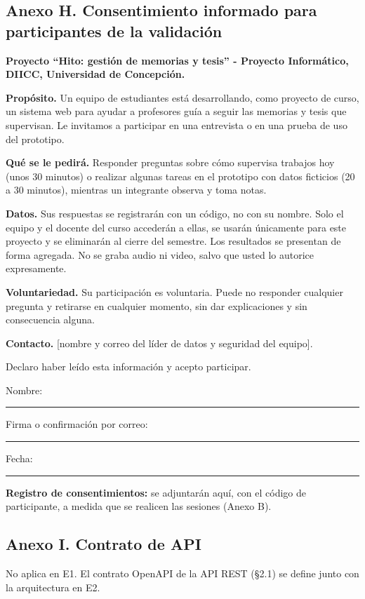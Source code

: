 \documentclass[10pt,a4paper]{article}
\newcommand{\ph}[1]{{\color{nota}#1}}
\begin{document}
\subsection*{Anexo H. Consentimiento informado para participantes de la validación}
\begin{cajainfo}
\textbf{Proyecto ``Hito: gestión de memorias y tesis'' - Proyecto Informático, DIICC, Universidad de Concepción.}\par
\textbf{Propósito.} Un equipo de estudiantes está desarrollando, como proyecto de curso, un sistema web para ayudar a profesores guía a seguir las memorias y tesis que supervisan. Le invitamos a participar en una entrevista o en una prueba de uso del prototipo.\par
\textbf{Qué se le pedirá.} Responder preguntas sobre cómo supervisa trabajos hoy (unos 30 minutos) o realizar algunas tareas en el prototipo con datos ficticios (20 a 30 minutos), mientras un integrante observa y toma notas.\par
\textbf{Datos.} Sus respuestas se registrarán con un código, no con su nombre. Solo el equipo y el docente del curso accederán a ellas, se usarán únicamente para este proyecto y se eliminarán al cierre del semestre. Los resultados se presentan de forma agregada. No se graba audio ni video, salvo que usted lo autorice expresamente.\par
\textbf{Voluntariedad.} Su participación es voluntaria. Puede no responder cualquier pregunta y retirarse en cualquier momento, sin dar explicaciones y sin consecuencia alguna.\par
\textbf{Contacto.} \ph{[nombre y correo del líder de datos y seguridad del equipo]}.\par
\medskip
Declaro haber leído esta información y acepto participar.\par
Nombre: \rule{5cm}{0.4pt}\quad Firma o confirmación por correo: \rule{4cm}{0.4pt}\quad Fecha: \rule{2.5cm}{0.4pt}
\end{cajainfo}

\textbf{Registro de consentimientos:} \ph{se adjuntarán aquí, con el código de participante, a medida que se realicen las sesiones (Anexo B).}

\subsection*{Anexo I. Contrato de API}
No aplica en E1. El contrato OpenAPI de la API REST (§2.1) se define junto con la arquitectura en E2.
\end{document}
